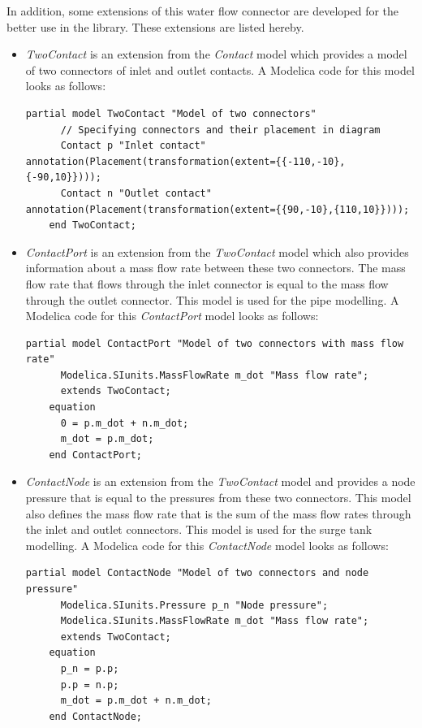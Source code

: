\documentclass[%
]{USN-PhD}
\begin{document}
In addition, some extensions of this water flow connector are developed for the better use in the library. These extensions are listed hereby.
\begin{itemize}
    \item \emph{TwoContact} is an extension from the \emph{Contact} model which provides a model of two connectors of inlet and outlet contacts. A Modelica code for this model looks as follows:
    \begin{lstlisting}[language = modelica]
    partial model TwoContact "Model of two connectors"
      // Specifying connectors and their placement in diagram
      Contact p "Inlet contact" annotation(Placement(transformation(extent={{-110,-10},{-90,10}})));
      Contact n "Outlet contact" annotation(Placement(transformation(extent={{90,-10},{110,10}})));
    end TwoContact;
    \end{lstlisting}
    \item \emph{ContactPort} is an extension from the \emph{TwoContact} model which also provides information about a mass flow rate between these two connectors. The mass flow rate that flows through the inlet connector is equal to the mass flow through the outlet connector. This model is used for the pipe modelling. A Modelica code for this \emph{ContactPort} model looks as follows:
    \begin{lstlisting}[language = modelica]
    partial model ContactPort "Model of two connectors with mass flow rate"
      Modelica.SIunits.MassFlowRate m_dot "Mass flow rate";
      extends TwoContact;
    equation
      0 = p.m_dot + n.m_dot;
      m_dot = p.m_dot;
    end ContactPort;
    \end{lstlisting}
    \item \emph{ContactNode} is an extension from the \emph{TwoContact} model and provides a node pressure that is equal to the pressures from these two connectors. This model also defines the mass flow rate that is the sum of the mass flow rates through the inlet and outlet connectors. This model is used for the surge tank modelling. A Modelica code for this \emph{ContactNode} model looks as follows:
    \begin{lstlisting}[language = modelica]
    partial model ContactNode "Model of two connectors and node pressure"
      Modelica.SIunits.Pressure p_n "Node pressure";
      Modelica.SIunits.MassFlowRate m_dot "Mass flow rate";
      extends TwoContact;
    equation
      p_n = p.p;
      p.p = n.p;
      m_dot = p.m_dot + n.m_dot;
    end ContactNode;
    \end{lstlisting}

\end{itemize}
\end{document}

